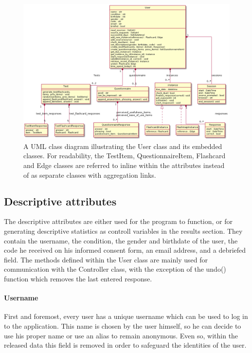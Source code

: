 \begin{figure}
    \centering
    \includegraphics[width=\textwidth]{img/classdiagram_user.png}
    \caption{A UML class diagram illustrating the User class and its embedded classes. For readability, the TestItem, QuestionnaireItem, Flashcard and Edge classes are referred to inline within the attributes instead of as separate classes with aggregation links.}
    \label{fig:classdiagram_user}
\end{figure}

\subsection{Descriptive attributes}

The descriptive attributes are either used for the program to function, or for generating descriptive statistics as controll variables in the results section. They contain the username, the condition, the gender and birthdate of the user, the code he received on his informed consent form, an email address, and a debriefed field. The methods defined within the User class are mainly used for communication with the Controller class, with the exception of the undo() function which removes the last entered response.

\paragraph{Username} First and foremost, every user has a unique username which can be used to log in to the application. This name is chosen by the user himself, so he can decide to use his proper name or use an alias to remain anonymous. Even so, within the released data this field is removed in order to safeguard the identities of the user.

